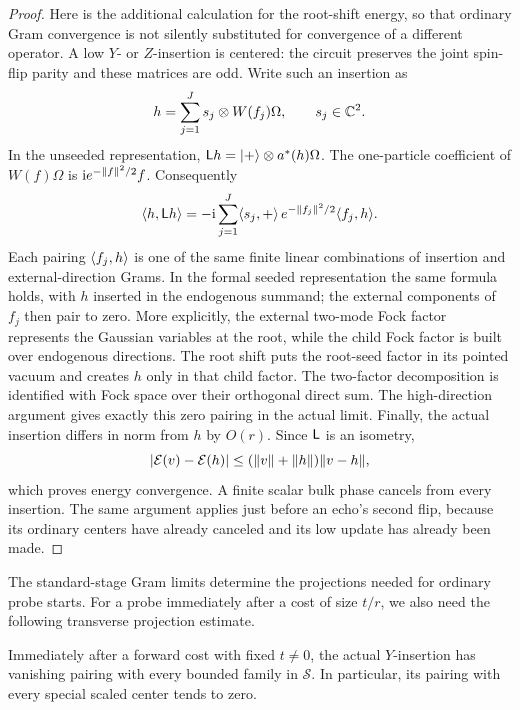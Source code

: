 \begin{proof}
Here is the additional calculation for the root-shift energy, so that
ordinary Gram convergence is not silently substituted for convergence
of a different operator.  A low \(Y\)- or \(Z\)-insertion is centered:
the circuit preserves the joint spin-flip parity and these matrices are
odd.  Write such an insertion as
\[
 h=\sum_{j=1}^J s_j\otimes W(f_j)\Omega,
 \qquad s_j\in\mathbb C^2.
\]
In the unseeded representation,
\(\mathsf L h=\lvert +\rangle\otimes a^*(h)\Omega\).  The one-particle coefficient
of \(W(f)\Omega\) is
\(\mathrm i e^{-\lVert f\rVert^2/2}f\).  Consequently
\begin{equation}
\label{eq:seed-energy-weyl-sum}
 \langle h,\mathsf L h\rangle
 =-\mathrm i\sum_{j=1}^J
       \langle s_j,+\rangle\,e^{-\lVert f_j\rVert^2/2}\langle f_j,h\rangle.
\end{equation}
Each pairing \(\langle f_j,h\rangle\) is one of the same finite linear
combinations of insertion and external-direction Grams.  In the formal
seeded representation the same formula holds, with \(h\) inserted in
the endogenous summand; the external components of \(f_j\) then pair
to zero. More explicitly, the external two-mode Fock factor represents
the Gaussian variables at the root, while the child Fock factor is
built over endogenous directions. The root shift puts the root-seed
factor in its pointed vacuum and creates \(h\) only in that child
factor. The two-factor decomposition is identified with Fock space
over their orthogonal direct sum.  The high-direction argument gives
exactly this zero pairing in the actual limit.  Finally, the actual insertion differs in norm
from \(h\) by \(O(r)\).  Since \(\mathsf L\) is an isometry,
\[
 \lvert \mathcal E(v)-\mathcal E(h)\rvert
 \leq(\lVert v\rVert+\lVert h\rVert)\lVert v-h\rVert,
\]
which proves energy convergence.  A finite scalar bulk phase cancels
from every insertion.  The same argument applies just before an echo's
second flip, because its ordinary centers have already canceled and its
low update has already been made.
\end{proof}

The standard-stage Gram limits determine the projections needed for
ordinary probe starts.  For a probe immediately after a cost of size
\(t/r\), we also need the following transverse projection estimate.

\begin{lemma}
\label{lem:seed-huge-transverse}
Immediately after a forward cost with fixed \(t\neq0\), the actual
\(Y\)-insertion has vanishing pairing with every bounded family in
\(\mathcal S\).  In particular, its pairing with every special scaled
center tends to zero.
\end{lemma}

